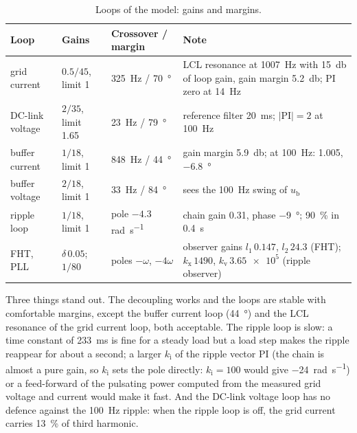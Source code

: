 \documentclass[11pt,a4paper]{scrartcl}
\newcommand{\ped}[1]{_{\mathrm{#1}}}
\begin{document}
\begin{onehalfspace}
\begin{table}[H]
	\centering
	\captionsetup{width=0.9\textwidth, font=small}
	\caption[Loops of the model.]{Loops of the model: gains and margins.}
	\label{tab:loops}
	\begin{tabularx}{0.97\textwidth}{@{} l l l X @{}}
		\toprule
		\textbf{Loop} & \textbf{Gains} & \textbf{Crossover / margin} & \textbf{Note} \\
		\midrule
		grid current & $0.5 / 45$, limit 1 & \SI{325}{\hertz} / \SI{70}{\degree} & LCL resonance at \SI{1007}{\hertz} with \SI{15}{\decibel} of loop gain, gain margin \SI{5.2}{\decibel}; PI zero at \SI{14}{\hertz} \\
		DC-link voltage & $2 / 35$, limit 1.65 & \SI{23}{\hertz} / \SI{79}{\degree} & reference filter \SI{20}{\milli\second}; $|\mathrm{PI}| = 2$ at \SI{100}{\hertz} \\
		buffer current & $1 / 18$, limit 1 & \SI{848}{\hertz} / \SI{44}{\degree} & gain margin \SI{5.9}{\decibel}; at \SI{100}{\hertz}: 1.005, \SI{-6.8}{\degree} \\
		buffer voltage & $2 / 18$, limit 1 & \SI{33}{\hertz} / \SI{84}{\degree} & sees the \SI{100}{\hertz} swing of $u\ped{b}$ \\
		ripple loop & $1 / 18$, limit 1 & pole $-4.3$ \si{\radian\per\second} & chain gain 0.31, phase \SI{-9}{\degree}; \SI{90}{\percent} in \SI{0.4}{\second} \\
		FHT, PLL & $\delta\,0.05$; $1 / 80$ & poles $-\omega$, $-4\omega$ & observer gains $l_1\,0.147$, $l_2\,24.3$ (FHT); $k\ped{x}\,1490$, $k\ped{v}\,\num{3.65e5}$ (ripple observer) \\
		\bottomrule
	\end{tabularx}
\end{table}

Three things stand out. The decoupling works and the loops are stable with comfortable margins, except the buffer current loop (\SI{44}{\degree}) and the LCL resonance of the grid current loop, both acceptable. The ripple loop is slow: a time constant of \SI{233}{\milli\second} is fine for a steady load but a load step makes the ripple reappear for about a second; a larger $k\ped{i}$ of the ripple vector PI (the chain is almost a pure gain, so $k\ped{i}$ sets the pole directly: $k\ped{i} = 100$ would give \SI{-24}{\radian\per\second}) or a feed-forward of the pulsating power computed from the measured grid voltage and current would make it fast. And the DC-link voltage loop has no defence against the \SI{100}{\hertz} ripple: when the ripple loop is off, the grid current carries \SI{13}{\percent} of third harmonic.


\end{onehalfspace}
\end{document}
